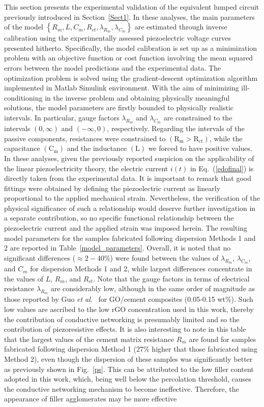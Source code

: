 \documentclass[a4paper,fleqn]{cas-sc}
\begin{document}
This section presents the experimental validation of the equivalent lumped circuit previously introduced in Section~\ref{Sect1}. In these analyses, the main parameters of the model $\left\{R_m, L, C_m, R_{ct}, \lambda_{R_m}, \lambda_{C_m}\right\}$ are estimated through inverse calibration using the experimentally assessed piezoelectric voltage curves presented hitherto. Specifically, the model calibration is set up as a minimization problem with an objective function or cost function involving the mean squared errors between the model predictions and the experimental data. The optimization problem is solved using the gradient-descent optimization algorithm implemented in Matlab Simulink environment. With the aim of minimizing ill-conditioning in the inverse problem and obtaining physically meaningful solutions, the model parameters are firstly bounded to physically realistic intervals. In particular, gauge factors $\lambda_{R_m}$ and $\lambda_{C_m}$ are constrained to the intervals $(0, \infty)$ and $(-\infty, 0)$, respectively. Regarding the intervals of the passive components, resistances were constrained to $\mathrm{(R_m > R_{ct})}$, while the capacitance $\mathrm{(C_m)}$ and the inductance $\mathrm{(L)}$ we forced to have positive values. In these analyses, given the previously reported suspicion on the applicability of the linear piezoelectricity theory, the electric current $i(t)$ in Eq.~(\ref{edofinal}) is directly taken from the experimental data. It is important to remark that good fittings were obtained by defining the piezoelectric current as linearly proportional to the applied mechanical strain. Nevertheless, the verification of the physical significance of such a relationship would deserve further investigation in a separate contribution, so no specific functional relationship between the piezoelectric current and the applied strain was imposed herein. The resulting model parameters for the samples fabricated following dispersion Methods 1 and 2 are reported in Table~\ref{model_parameters}. Overall, it is noted that no significant differences ($\approx 2-40\%$) were found between the values of $\lambda_{R_m}$, $\lambda_{C_m}$, and $C_m$ for dispersion Methods 1 and 2, while largest differences concentrate in the values of $L$, $R_m$, and $R_{ct}$. Note that the gauge factors in terms of electrical resistance $\lambda_{R_m}$ are considerably low, although in the same order of magnitude as those reported by Guo \textit{et al}.~\cite{guo2021study} for GO/cement composites (0.05-0.15 wt\%). Such low values are ascribed to the low rGO concentration used in this work, thereby the contribution of conductive networking is presumably limited and so the contribution of piezoresistive effects. It is also interesting to note in this table that the largest values of the cement matrix resistance $R_m$ are found for samples fabricated following dispersion Method 1 (27\% higher that those fabricated using Method 2), even though the dispersion of these samples was significantly better as previously shown in Fig.~\ref{ps}. This can be attributed to the low filler content adopted in this work, which, being well below the percolation threshold, causes the conductive networking mechanism to become ineffective. Therefore, the appearance of filler agglomerates may be more effective 
\end{document}
